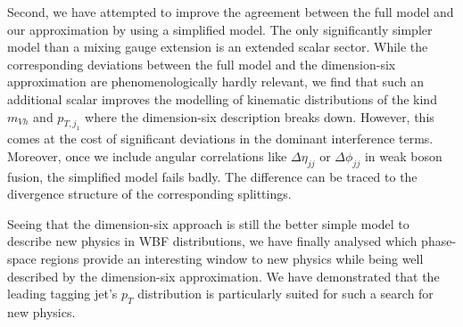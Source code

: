 Second, we have attempted to improve the agreement between the full
model and our approximation by using a simplified model. The only
significantly simpler model than a mixing gauge extension is an
extended scalar sector. While the corresponding deviations between the
full model and the dimension-six approximation are phenomenologically
hardly relevant, we find that such an additional scalar improves the
modelling of kinematic distributions of the kind $m_{Vh}$ and
$p_{T,j_1}$ where the dimension-six description breaks down. However,
this comes at the cost of significant deviations in the dominant
interference terms. Moreover, once we include angular correlations
like $\Delta \eta_{jj}$ or $\Delta \phi_{jj}$ in weak boson fusion,
the simplified model fails badly. The difference can be traced to the
divergence structure of the corresponding splittings.

Seeing that the dimension-six approach is still the better simple model
to describe new physics in WBF distributions, we have finally analysed
which phase-space regions provide an interesting window to new physics
while being well described by the dimension-six approximation.  We have
demonstrated that the leading tagging jet's $p_T$ distribution is
particularly suited for such a search for new physics.
